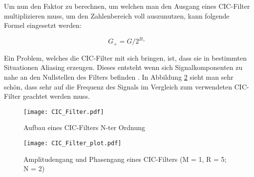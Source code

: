 Um nun den Faktor zu berechnen, um welchen man den Ausgang eines CIC-Filter multiplizieren muss, um den Zahlenbereich voll auszunutzen, kann folgende Formel eingesetzt werden:

\begin{equation}
G_+ = G/2^{B_+}
\label{equ:cic_gain+}
\end{equation}

Ein Problem, welches die CIC-Filter mit sich bringen, ist, dass sie in bestimmten Situationen Aliasing erzeugen. Dieses entsteht wenn sich Signalkomponenten zu nahe an den Nullstellen des Filters befinden \cite{CIC_Aliasing}. In Abbildung \ref{img:CIC_Filter_plot} sieht man sehr schön, dass sehr auf die Frequenz des Signals im Vergleich zum verwendeten CIC-Filter geachtet werden muss.


\begin{figure}[h]
	\centering
	\texttt{[image: CIC\_Filter.pdf]}
	\caption{Aufbau eines CIC-Filters N-ter Ordnung}
	\label{img:CIC_Filter}
\end{figure}

\begin{figure}[h]
	\centering
	\texttt{[image: CIC\_Filter\_plot.pdf]}
	\caption{Amplitudengang und Phasengang eines CIC-Filters (M = 1, R = 5; N = 2)}
	\label{img:CIC_Filter_plot}
\end{figure}

\clearpage

